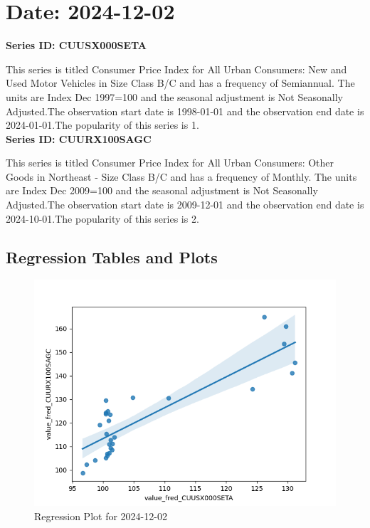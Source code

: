 \section{Date: 2024-12-02}
\noindent \textbf{Series ID: CUUSX000SETA} 

\noindent This series is titled Consumer Price Index for All Urban Consumers: New and Used Motor Vehicles in Size Class B/C and has a frequency of Semiannual. The units are Index Dec 1997=100 and the seasonal adjustment is Not Seasonally Adjusted.The observation start date is 1998-01-01 and the observation end date is 2024-01-01.The popularity of this series is 1. \\ 

\noindent \textbf{Series ID: CUURX100SAGC} 

\noindent This series is titled Consumer Price Index for All Urban Consumers: Other Goods in Northeast - Size Class B/C and has a frequency of Monthly. The units are Index Dec 2009=100 and the seasonal adjustment is Not Seasonally Adjusted.The observation start date is 2009-12-01 and the observation end date is 2024-10-01.The popularity of this series is 2. \\ 

\subsection{Regression Tables and Plots}


\begin{figure}
\centering
\includegraphics[scale = 0.9]{plots/plot_2024-12-02.png}
\caption{Regression Plot for 2024-12-02}
\end{figure}
\newpage

